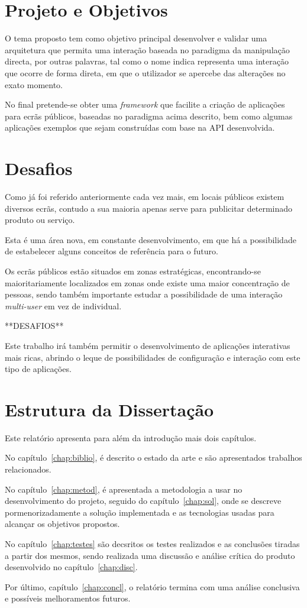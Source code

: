 \section{Projeto e Objetivos} \label{sec:proj}

O tema proposto tem como objetivo principal desenvolver e validar uma arquitetura que permita uma interação baseada no paradigma da manipulação directa, por outras palavras, tal como o nome indica representa uma interação que ocorre de forma direta, em que o utilizador se apercebe das alterações no exato momento.  

No final pretende-se obter uma \textit{framework} que facilite a criação de aplicações para ecrãs públicos, baseadas no paradigma acima descrito, bem como algumas aplicações exemplos que sejam construídas com base na API desenvolvida.

\section{Desafios} \label{sec:goals}

Como já foi referido anteriormente cada vez mais, em locais públicos existem diversos ecrãs, contudo a sua maioria apenas serve para publicitar determinado produto ou serviço. 

Esta é uma área nova, em constante desenvolvimento, em que há a possibilidade de estabelecer alguns conceitos de referência para o futuro.

Os ecrãs públicos estão situados em zonas estratégicas, encontrando-se maioritariamente localizados em zonas onde existe uma maior concentração de pessoas, sendo também importante estudar a possibilidade de uma interação \textit{multi-user} em vez de individual.

**DESAFIOS** 

Este trabalho irá também permitir o desenvolvimento de aplicações interativas mais ricas, abrindo o leque de possibilidades de configuração e interação com este tipo de aplicações. 

\section{Estrutura da Dissertação} \label{sec:struct}

Este relatório apresenta para além da introdução mais dois capítulos.

No capítulo~\ref{chap:biblio}, é descrito o estado da arte e são
apresentados trabalhos relacionados. 

No capítulo~\ref{chap:metod}, é apresentada a metodologia a usar no desenvolvimento do projeto, seguido do capítulo~\ref{chap:sol}, onde se descreve pormenorizadamente a solução implementada e as  tecnologias usadas para alcançar os objetivos propostos.

No capítulo~\ref{chap:testes} são decsritos os testes realizados e as conclusões tiradas a partir dos mesmos, sendo realizada uma discussão e análise crítica do produto desenvolvido no capítulo~\ref{chap:disc}.

Por último, capítulo~\ref{chap:concl}, o relatório termina com uma análise conclusiva e possíveis melhoramentos futuros.
